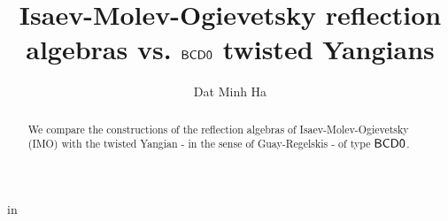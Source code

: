 

\setcounter{section}{-1}


\renewcommand{\simpleroots}{\mathbb{I}}



    \title{Isaev-Molev-Ogievetsky reflection algebras vs. $\mathsf{B}\mathsf{C}\mathsf{D}\mathsf{0}$ twisted Yangians}
    
    \author{Dat Minh Ha}
    \maketitle
    
    \begin{abstract}
        We compare the constructions of the reflection algebras of Isaev-Molev-Ogievetsky (IMO) with the twisted Yangian - in the sense of Guay-Regelskis - of type $\mathsf{B}\mathsf{C}\mathsf{D}\mathsf{0}$.
    \end{abstract}
    
    {
    \hypersetup{} 
    \tableofcontents %
    }

    

    

    
    
    \printbibliography

in